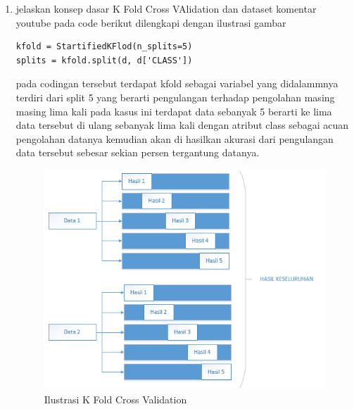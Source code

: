 \begin{enumerate}
\item jelaskan konsep dasar K Fold Cross VAlidation dan dataset komentar youtube pada code berikut dilengkapi dengan ilustrasi gambar  
\begin{verbatim}
kfold = StartifiedKFlod(n_splits=5)
splits = kfold.split(d, d['CLASS'])
\end{verbatim}
pada codingan tersebut terdapat kfold sebagai variabel yang didalammnya terdiri dari split 5 yang berarti pengulangan terhadap pengolahan masing masing lima kali pada kasus ini terdapat data sebanyak 5 berarti ke lima data tersebut di ulang sebanyak lima kali dengan atribut class sebagai acuan pengolahan datanya kemudian akan di hasilkan akurasi dari pengulangan data tersebut sebesar sekian persen tergantung datanya.
\begin{figure}[ht]
\centering
\includegraphics[scale=0.4]{figures/1174042/chapter7/1,2.PNG}
\caption{Ilustrasi K Fold Cross Validation}
\label{Contoh}
\end{figure}



\end{enumerate}
